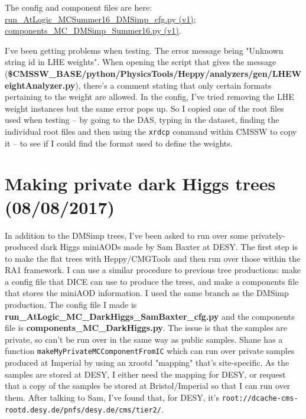 The config and component files are here: \href{run:sec24/run_AtLogic_MCSummer16_DMSimp_cfgv1.py}{run\_AtLogic\_MCSummer16\_DMSimp\_cfg.py (v1)}; \href{run:sec24/components_MC_DMSimp_Summer16v1.py}{components\_MC\_DMSimp\_Summer16.py (v1)}.

I've been getting problems when testing. The error message being "Unknown string id in LHE weights". When opening the script that gives the message (\textbf{\$CMSSW\_BASE/python/PhysicsTools/Heppy/analyzers/gen/LHEWeightAnalyzer.py}), there's a comment stating that only certain formats pertaining to the weight are allowed. In the config, I've tried removing the LHE weight instances but the same error pops up. So I copied one of the root files used when testing -- by going to the DAS, typing in the dataset, finding the individual root files and then using the \verb!xrdcp! command within CMSSW to copy it -- to see if I could find the format used to define the weights.




\section{Making private dark Higgs trees (08/08/2017)}

In addition to the DMSimp trees, I've been asked to run over some privately-produced dark Higgs miniAODs made by Sam Baxter at DESY. The first step is to make the flat trees with Heppy/CMGTools and then run over those within the RA1 framework. I can use a similar procedure to previous tree productions: make a config file that DICE can use to produce the trees, and make a components file that stores the miniAOD information. I used the same branch as the DMSimp production. The config file I made is \textbf{run\_AtLogic\_MC\_DarkHiggs\_SamBaxter\_cfg.py} and the components file is \textbf{components\_MC\_DarkHiggs.py}. The issue is that the samples are private, so can't be run over in the same way as public samples. Shane has a function \texttt{makeMyPrivateMCComponentFromIC} which can run over private samples produced at Imperial by using an xrootd "mapping" that's site-specific. As the samples are stored at DESY, I either need the mapping for DESY, or request that a copy of the samples be stored at Bristol/Imperial so that I can run over them. After talking to Sam, I've found that, for DESY, it's \texttt{root://dcache-cms-rootd.desy.de/pnfs/desy.de/cms/tier2/}.

